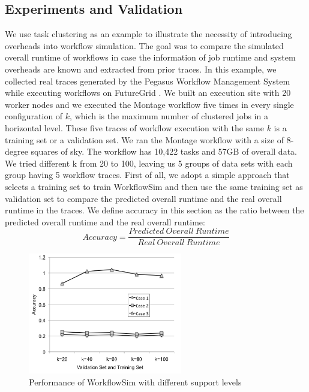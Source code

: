 \subsection{Experiments and Validation}
We use task clustering as an example to illustrate the necessity of introducing overheads into workflow simulation. The goal was to compare the simulated overall runtime of workflows in case the information of job runtime and system overheads are known and extracted from prior traces. 
In this example, we collected real traces generated by the Pegasus Workflow Management System while executing workflows on FutureGrid \cite{FutureGrid}. We built an execution site with 20 worker nodes and we executed the Montage workflow five times in every single configuration of $k$, which is the maximum number of clustered jobs in a horizontal level. These five traces of workflow execution with the same $k$ is a training set or a validation set. 
We ran the Montage workflow with a size of 8-degree squares of sky. The workflow has 10,422 tasks and 57GB of overall data. We tried different k from 20 to 100, leaving us 5 groups of data sets with each group having 5 workflow traces. 
First of all, we adopt a simple approach that selects a training set to train WorkflowSim and then use the same training set as validation set to compare the predicted overall runtime and the real overall runtime in the traces. We define accuracy in this section as the ratio between the predicted overall runtime and the real overall runtime:
\begin{equation} \label{eq:model_wfs_accuracy}
Accuracy=\frac{Predicted~Overall~Runtime}{Real~Overall~Runtime}
\end{equation}
 \begin{figure}[h!]
	\centering
    \includegraphics[width=0.6\textwidth]{figures/model/wfs_levels.pdf}
    \caption{Performance of WorkflowSim with different support levels}
    \label{fig:model_wfs_levels}
\end{figure} 
 
